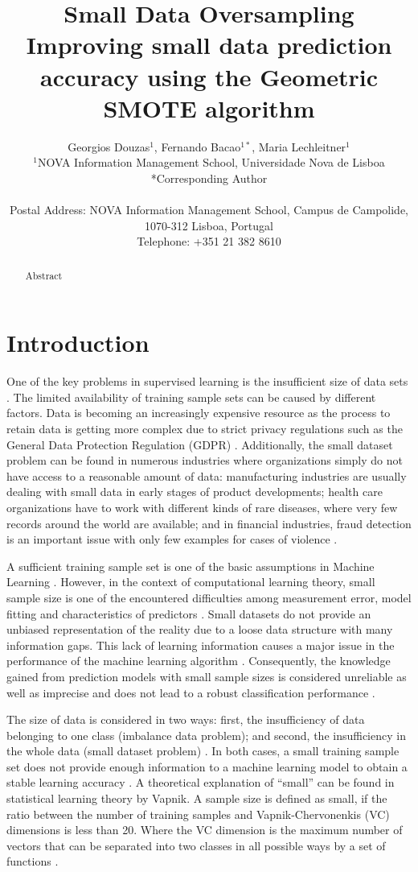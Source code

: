 \documentclass[parskip=full]{scrartcl}
\title{Small Data Oversampling  \\ \LARGE{Improving small data prediction accuracy using the Geometric SMOTE algorithm}}
\author{
	Georgios Douzas\(^{1}\), Fernando Bacao\(^{1*}\), Maria Lechleitner\(^{1}\) 
	\\
	\small{\(^{1}\)NOVA Information Management School, Universidade Nova de Lisboa}
	\\
	\small{*Corresponding Author}
	\\
	\\
	\small{Postal Address: NOVA Information Management School, Campus de Campolide, 1070-312 Lisboa, Portugal}
	\\
	\small{Telephone: +351 21 382 8610}
}
\date{}
\begin{document}
\maketitle

\begin{abstract}
Abstract
\end{abstract}

\section{Introduction}
One of the key problems in supervised learning is the insufficient size of data
sets \cite{Niyogi.1998}. The limited availability of training sample sets can be
caused by different factors. Data is becoming an increasingly expensive resource
\cite{Li.2007} as the process to retain data is getting more complex due to
strict privacy regulations such as the General Data Protection Regulation (GDPR)
\cite{EuropeanCommission.2019}. Additionally, the small dataset problem can be
found in numerous industries where organizations simply do not have access to a
reasonable amount of data: manufacturing industries are usually dealing with
small data in early stages of product developments; health care organizations
have to work with different kinds of rare diseases, where very few records
around the world are available; and in financial industries, fraud detection is
an important issue with only few examples for cases of violence
\cite{AbdulLateh.2017}.

A sufficient training sample set is one of the basic assumptions in Machine
Learning \cite{Ivanescu.2006}. However, in the context of computational learning
theory, small sample size is one of the encountered difficulties among
measurement error, model fitting and characteristics of predictors
\cite{AbdulLateh.2017}. Small datasets do not provide an unbiased representation
of the reality due to a loose data structure with many information gaps. This
lack of learning information causes a major issue in the performance of the
machine learning algorithm \cite{Lin.2018}. Consequently, the knowledge gained
from prediction models with small sample sizes is considered unreliable as well
as imprecise and does not lead to a robust classification performance
\cite{AbdulLateh.2017}.

The size of data is considered in two ways: first, the insufficiency of data
belonging to one class (imbalance data problem); and second, the insufficiency
in the whole data (small dataset problem) \cite{Sezer.2014}. In both cases, a
small training sample set does not provide enough information to a machine
learning model to obtain a stable learning accuracy \cite{Tsai.2008}. A
theoretical explanation of “small” can be found in statistical learning theory
by Vapnik. A sample size is defined as small, if the ratio between the number of
training samples and Vapnik-Chervonenkis (VC) dimensions is less than 20. Where
the VC dimension is the maximum number of vectors that can be separated into two
classes in all possible ways by a set of functions \cite{Vapnik.2008}. 
\end{document}
